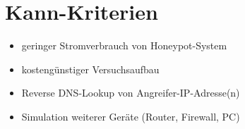 \section{Kann-Kriterien}
\label{subsec:Kann-Kriterien}
\begin{itemize}
\item geringer Stromverbrauch von Honeypot-System
\item kostengünstiger Versuchsaufbau
\item Reverse DNS-Lookup von Angreifer-IP-Adresse(n)
\item Simulation weiterer Geräte (Router, Firewall, PC)
\end{itemize}


